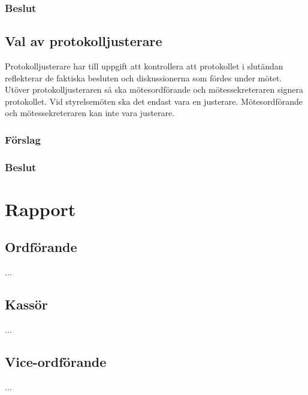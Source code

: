 \documentclass[protokoll]{dvd}
\begin{document}
\subsubsection*{Beslut}
\begin{attsatser}
    \item %
\end{attsatser}

\subsection{Val av protokolljusterare}

Protokolljusterare har till uppgift att kontrollera att protokollet i slutändan reflekterar de faktiska besluten och diskussionerna som fördes under mötet.
Utöver protokolljusteraren så ska mötesordförande och mötessekreteraren signera protokollet.
Vid styrelsemöten ska det endast vara en justerare.
Mötesordförande och mötessekreteraren kan inte vara justerare.

\subsubsection*{Förslag}
\begin{attsatser}
    \item 
\end{attsatser}
\subsubsection*{Beslut}
\begin{attsatser}
    \item %
\end{attsatser}

\section{Rapport} 
\subsection{Ordförande}
...

\subsection{Kassör}
...

\subsection{Vice-ordförande}
...
\end{document}
